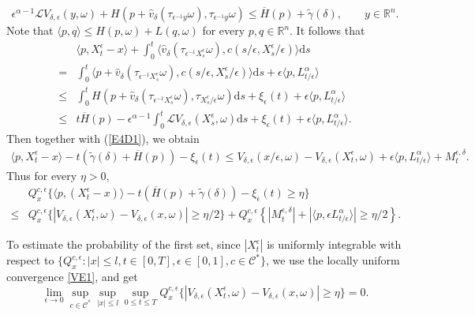 \documentclass[11pt,reqno]{amsart}
\theoremstyle{definition}
\theoremstyle{remark}
\numberwithin{equation}{section}
\newcommand{\eps}{\epsilon}
\newcommand{\R}{{\mathbb{R}}}
\begin{document}
\begin{equation*}
    \epsilon^{\alpha - 1}\mathscr{L}V_{\delta,\eps}(y,\omega) + H(p + \hat{v}_{\delta}(\tau_{\epsilon^{-1}y}\omega), \tau_{\epsilon^{-1}y}\omega) \leq \overline{H}(p) + \widetilde{\gamma}(\delta), \qquad y\in \R^n.
\end{equation*}
Note that $ \langle p, q\rangle \leq H(p,\omega) + L(q, \omega)$ for every $p,q \in\mathbb{R}^n$. It follows that
\begin{align}\label{E4D2}
    & \langle p, X^{\epsilon}_t - x \rangle + \int^{t}_{0} \langle \hat{v}_{\delta}(\tau_{\epsilon^{-1}X^{\epsilon}_{s}}\omega), c(s/\epsilon, X^{\epsilon}_{s}/\epsilon) \rangle \mathrm{d}s \nonumber \\
    = & \int^{t}_{0}\langle p+\hat{v}_{\delta}(\tau_{\epsilon^{-1}X^{\epsilon}_{s}}\omega), c(s/\epsilon, X^{\epsilon}_{s}/\epsilon)\rangle \mathrm{d}s + \epsilon\langle p,  L^{\alpha}_{t/\eps} \rangle \nonumber \\
    \leq & \int^{t}_{0} H(p+\hat{v}_{\delta}(\tau_{\epsilon^{-1}X^{\epsilon}_{s}}\omega),\tau_{X^{\epsilon}_{s}/\epsilon}\omega)\mathrm{d}s + \xi_{\epsilon}(t) + \epsilon\langle p,  L^{\alpha}_{t/\eps}\rangle \nonumber \\
    \leq & t\overline{H}(p)  - \epsilon^{\alpha -1}\int^{t}_{0}\mathscr{L}V_{\delta,\eps}(X^{\epsilon}_{s},\omega) \mathrm{d}s + \xi_{\epsilon}(t) + \epsilon\langle p,  L^{\alpha}_{t/\eps}\rangle.
\end{align}
Then together with (\ref{E4D1}), we obtain
\begin{align}\label{supersolC}
    \langle p, X^{\epsilon}_t - x \rangle - t(\widetilde{\gamma}(\delta)+\overline{H}(p))  - \xi_{\epsilon}(t)  \leq   V_{\delta,\epsilon}(x/\epsilon,\omega) -V_{\delta,\epsilon}(X^{\epsilon}_{t},\omega)  + \epsilon \langle p, L^{\alpha}_{t/\eps}\rangle + M_t^{\epsilon,\delta}.
\end{align}
Thus for every $\eta >0$,
\begin{align}\label{LE1}
    & Q^{c, \epsilon}_{x} \{ \langle p, (X^{\epsilon}_{t} -x) \rangle - t(\overline{H}(p)+\widetilde{\gamma}(\delta))- \xi_{\epsilon}(t) \geq \eta \} \nonumber \\
    \leq & Q^{c, \epsilon}_{x} \{|V_{\delta,\epsilon}(X^{\epsilon}_t,\omega) - V_{\delta,\epsilon}(x,\omega)| \geq \eta/2 \} + Q^{c, \epsilon}_{x}\left\{|M_t^{\epsilon,\delta}|+
    |\langle p,\eps L_{t/\eps}^{\alpha}\rangle| \geq \eta/2 \right\}.
\end{align}

To estimate the probability of the first set, since $|X^{\epsilon}_{t}|$ is uniformly integrable with respect to $\{Q^{c,\epsilon}_{x}: |x| \leq l, t\in [0,T], \epsilon\in [0,1], c\in \mathscr{C}^{\ast}  \}$, we use the locally uniform convergence \eqref{VE1}, and get
\begin{equation}
\label{LE2}
    \lim_{\epsilon\to 0}\sup_{c\in\mathscr{C}^{\ast}} \sup_{|x| \leq l} \sup_{0 \leq t \leq T} Q^{c, \epsilon}_{x}\{|V_{\delta,\epsilon}(X^{\epsilon}_t,\omega) - V_{\delta,\epsilon}(x,\omega)| \geq \eta \} = 0.
\end{equation}
\end{document}
